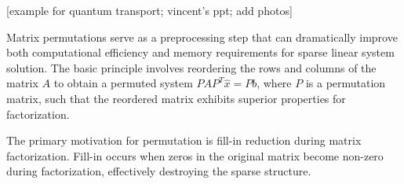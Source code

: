 [example for quantum transport; vincent's ppt; add photos]




Matrix permutations serve as a preprocessing step that can dramatically improve both computational efficiency and memory requirements for sparse linear system solution. The basic principle involves reordering the rows and columns of the matrix $A$ to obtain a permuted system $PAP^T \hat{x} = Pb$, where $P$ is a permutation matrix, such that the reordered matrix exhibits superior properties for factorization.

The primary motivation for permutation is fill-in reduction during matrix factorization. Fill-in occurs when zeros in the original matrix become non-zero during factorization, effectively destroying the sparse structure.






